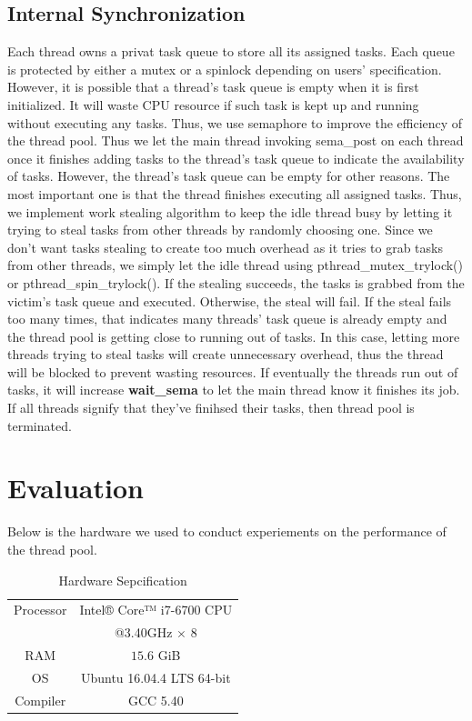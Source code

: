 \documentclass[journal, a4paper]{IEEEtran}
\begin{document}
\subsection{Internal Synchronization}
Each thread owns a privat task queue to store all its assigned tasks. Each queue is protected by either a mutex or a spinlock depending on users' specification. However, it is possible that a thread's task queue is empty when it is first initialized. It will waste CPU resource if such task is kept up and running without executing any tasks. Thus, we use semaphore to improve the efficiency of the thread pool. Thus we let the main thread invoking sema\_post on each thread once it finishes adding tasks to the thread's task queue to indicate the availability of tasks. However, the thread's task queue can be empty for other reasons. The most important one is that the thread finishes executing all assigned tasks. Thus, we implement work stealing algorithm to keep the idle thread busy by letting it trying to steal tasks from other threads by randomly choosing one. Since we don't want tasks stealing to create too much overhead as it tries to grab tasks from other threads, we simply let the idle thread using pthread\_mutex\_trylock() or pthread\_spin\_trylock(). If the stealing succeeds, the tasks is grabbed from the victim's task queue and executed. Otherwise, the steal will fail. If the steal fails too many times, that indicates many threads' task queue is already empty and the thread pool is getting close to running out of tasks. In this case, letting more threads trying to steal tasks will create unnecessary overhead, thus the thread will be blocked to prevent wasting resources. If eventually the threads run out of tasks, it will increase \textbf{wait\_sema} to let the main thread know it finishes its job. If all threads signify that they've finihsed their tasks, then thread pool is terminated.

\section{Evaluation}
Below is the hardware we used to conduct experiements on the performance of the thread pool.
	\begin{table}[!hbt]
	\begin{center}
		\caption{Hardware Sepcification}
		\label{tab:simParameters}
		\begin{tabular}{|c|c|}
			\hline
			Processor & Intel® Core™ i7-6700 CPU \\
								&@3.40GHz $\times$ 8\\
			\hline
			RAM & $15.6$ GiB \\
			\hline
			OS & Ubuntu 16.04.4 LTS 64-bit\\
			\hline
			Compiler & GCC 5.40\\
			\hline
		\end{tabular}
		\end{center}
	\end{table}
	
\end{document}
